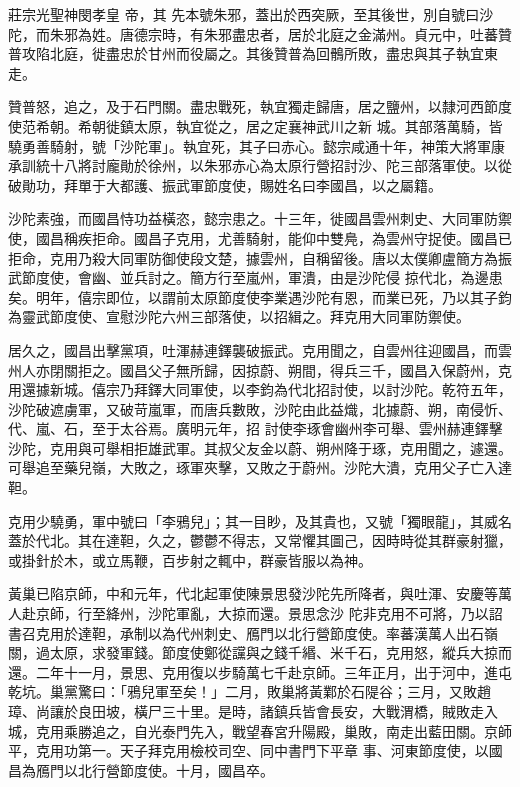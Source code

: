 
\begin{pinyinscope}

 莊宗光聖神閔孝皇
 帝，其
 先本號朱邪，蓋出於西突厥，至其後世，別自號曰沙陀，而朱邪為姓。唐德宗時，有朱邪盡忠者，居於北庭之金滿州。貞元中，吐蕃贊普攻陷北庭，徙盡忠於甘州而役屬之。其後贊普為回鶻所敗，盡忠與其子執宜東走。



 贊普怒，追之，及于石門關。盡忠戰死，執宜獨走歸唐，居之鹽州，以隸河西節度使范希朝。希朝徙鎮太原，執宜從之，居之定襄神武川之新
 城。其部落萬騎，皆驍勇善騎射，號「沙陀軍」。執宜死，其子曰赤心。懿宗咸通十年，神策大將軍康承訓統十八將討龐勛於徐州，以朱邪赤心為太原行營招討沙、陀三部落軍使。以從破勛功，拜單于大都護、振武軍節度使，賜姓名曰李國昌，以之屬籍。



 沙陀素強，而國昌恃功益橫恣，懿宗患之。十三年，徙國昌雲州刺史、大同軍防禦使，國昌稱疾拒命。國昌子克用，尤善騎射，能仰中雙鳧，為雲州守捉使。國昌已拒命，克用乃殺大同軍防御使段文楚，據雲州，自稱留後。唐以太僕卿盧簡方為振武節度使，會幽、並兵討之。簡方行至嵐州，軍潰，由是沙陀侵
 掠代北，為邊患矣。明年，僖宗即位，以謂前太原節度使李業遇沙陀有恩，而業已死，乃以其子鈞為靈武節度使、宣慰沙陀六州三部落使，以招緝之。拜克用大同軍防禦使。



 居久之，國昌出擊黨項，吐渾赫連鐸襲破振武。克用聞之，自雲州往迎國昌，而雲州人亦閉關拒之。國昌父子無所歸，因掠蔚、朔間，得兵三千，國昌入保蔚州，克用還據新城。僖宗乃拜鐸大同軍使，以李鈞為代北招討使，以討沙陀。乾符五年，沙陀破遮虜軍，又破苛嵐軍，而唐兵數敗，沙陀由此益熾，北據蔚、朔，南侵忻、代、嵐、石，至于太谷焉。廣明元年，招
 討使李琢會幽州李可舉、雲州赫連鐸擊沙陀，克用與可舉相拒雄武軍。其叔父友金以蔚、朔州降于琢，克用聞之，遽還。可舉追至藥兒嶺，大敗之，琢軍夾擊，又敗之于蔚州。沙陀大潰，克用父子亡入達靼。



 克用少驍勇，軍中號曰「李鴉兒」；其一目眇，及其貴也，又號「獨眼龍」，其威名蓋於代北。其在達靼，久之，鬱鬱不得志，又常懼其圖己，因時時從其群豪射獵，或掛針於木，或立馬鞭，百步射之輒中，群豪皆服以為神。



 黃巢已陷京師，中和元年，代北起軍使陳景思發沙陀先所降者，與吐渾、安慶等萬人赴京師，行至絳州，沙陀軍亂，大掠而還。景思念沙
 陀非克用不可將，乃以詔書召克用於達靼，承制以為代州刺史、鴈門以北行營節度使。率蕃漢萬人出石嶺關，過太原，求發軍錢。節度使鄭從讜與之錢千緡、米千石，克用怒，縱兵大掠而還。二年十一月，景思、克用復以步騎萬七千赴京師。三年正月，出于河中，進屯乾坑。巢黨驚曰：「鴉兒軍至矣！」二月，敗巢將黃鄴於石隄谷；三月，又敗趙璋、尚讓於良田坡，橫尸三十里。是時，諸鎮兵皆會長安，大戰渭橋，賊敗走入城，克用乘勝追之，自光泰門先入，戰望春宮升陽殿，巢敗，南走出藍田關。京師平，克用功第一。天子拜克用檢校司空、同中書門下平章
 事、河東節度使，以國昌為鴈門以北行營節度使。十月，國昌卒。




\end{pinyinscope}

